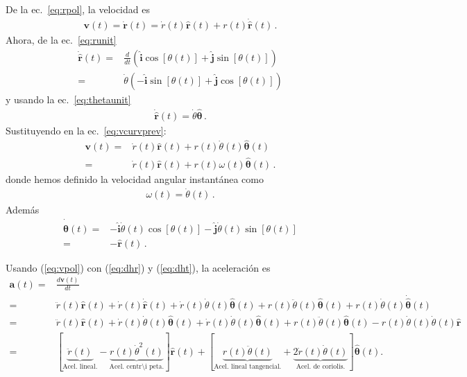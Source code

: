 De la ec.~\eqref{eq:rpol}, la velocidad es
\begin{align}
  \label{eq:vcurvprev}
  \mathbf{v}(t)=\dot{\mathbf{r}}(t)=\dot{r}(t)\hat{\mathbf{r}}(t)+
r(t)\dot{\hat{\mathbf{r}}}(t)\,.
\end{align}
Ahora, de la ec.~\eqref{eq:runit}
\begin{align}
  \dot{\hat{\mathbf{r}}}(t)=&\frac{d}{dt}\left(\hat{\mathbf{i}}\cos[\theta(t)]+\hat{\mathbf{j}}\sin[\theta(t)]\right)\nonumber\\
  =&\dot{\theta}
  \left(
    -\hat{\mathbf{i}}\sin[\theta(t)]+\hat{\mathbf{j}}\cos[\theta(t)]
  \right)
\end{align}
y usando la ec.~\eqref{eq:thetaunit}
\begin{align}
\label{eq:dhr}
\dot{\hat{\mathbf{r}}}(t)=\dot{\theta}\hat{\boldsymbol{\theta}}\,.
\end{align}
Sustituyendo en la ec.~\eqref{eq:vcurvprev}:
\begin{align}
  \label{eq:vpol}
  \mathbf{v}(t)=&\dot{r}(t)\hat{\mathbf{r}}(t)+r(t)\dot{\theta}(t)\hat{\boldsymbol{\theta}}(t)\nonumber\\
  =&\dot{r}(t)\hat{\mathbf{r}}(t)+r(t)\omega(t)\hat{\boldsymbol{\theta}}(t)\,.
\end{align}
donde hemos definido la velocidad angular instantánea como
\begin{align}
  \omega(t)=\dot\theta(t)\,.
\end{align}
Además
\begin{align}
\label{eq:dht}
  \dot{\hat{\boldsymbol{\theta}}}(t)=&
  -\hat{\mathbf{i}}\dot{\theta}(t)\cos[\theta(t)]-\hat{\mathbf{j}}\dot{\theta}(t)\sin[\theta(t)]\nonumber\\
  =&-\hat{\mathbf{r}}(t)\,.
\end{align}

Usando (\ref{eq:vpol}) con (\ref{eq:dhr})  y (\ref{eq:dht}), la aceleraci\'on es %
\begin{align}
\label{eq:apol}
  \mathbf{a}(t)=&\frac{d\mathbf{v}(t)}{dt}\nonumber\\
=& \ddot{r}(t)\hat{\mathbf{r}}(t)+\dot{r}(t)\dot{\hat{\mathbf{r}}}(t)+\dot{r}(t)\dot{\theta}(t)\hat{\boldsymbol{\theta}}(t)
+r(t)\ddot{\theta}(t)\hat{\boldsymbol{\theta}}(t)
+r(t)\dot{\theta}(t)\dot{\hat{\boldsymbol{\theta}}}(t) \nonumber\\
=&
 \ddot{r}(t)\hat{\mathbf{r}}(t)+\dot{r}(t)\dot{\theta}(t)\hat{\boldsymbol{\theta}}(t)+\dot{r}(t)\dot{\theta}(t)\hat{\boldsymbol{\theta}}(t)
+r(t)\ddot{\theta}(t)\hat{\boldsymbol{\theta}}(t)
-r(t)\dot{\theta}(t)\dot{\theta}(t)\hat{\mathbf{r}} \nonumber\\
=&[\underbrace{\ddot{r}(t)}_{{\text{Acel. lineal.}}}
-\underbrace{r(t)\dot{\theta}^2(t)}_{{\text{Acel. centr\'\i peta.}}}]\hat{\mathbf{r}}(t)
+[\underbrace{r(t)\ddot{\theta}(t)}_{{\text{Acel. lineal tangencial.}}}
+\underbrace{2\dot{r}(t)\dot{\theta}(t)}_{{\text{Acel. de coriolis.}}}]\hat{\boldsymbol{\theta}}(t).
\end{align}

